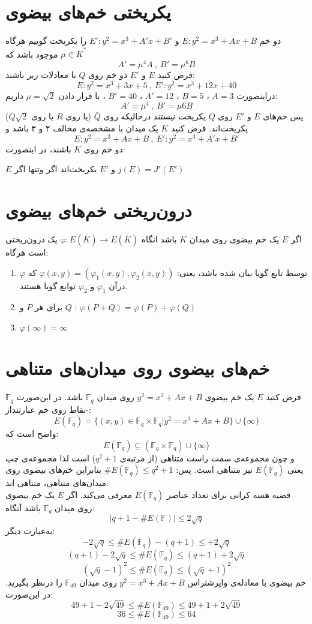 \section{یکریختی خم‌های بیضوی}
دو خم 
$E:y^2=x^3+Ax+B$
و
$E': y^2=x^3+A'x+B'$
را یکریخت گوییم هرگاه
$\mu \in {\bar{K}}^*$
موجود باشد که
$$ A'={\mu}^4A ~,~ B'={\mu}^6B $$
\example
فرض کنید
$E$
و
$E'$
دو خم روی 
$Q$
با معادلات زیر باشند:
$$ E:y^2=x^3+3x+5 ~,~  E':y^2=x^3+12x+40$$
دراینصورت
$A=3$
،
$B=5$
،
$A'=12$
،
$B'=40$
، با قرار دادن
$\mu = \sqrt{2}$
داریم:
$$ A'={\mu}^4 ~,~ B'={\mu}6B$$
پس خم‌های 
$E$
و
$E'$
روی
$Q$
 یکریخت نیستند درحالیکه روی
$\bar{Q}$
(یا روی 
$R$
یا روی
$Q\sqrt{2}$)
یکریخت‌اند.
\theorem
فرض کنید
$K$
یک میدان با مشخصه‌ی مخالف ۲ و ۳ باشد و 
$$ E:y^2=x^3+Ax+B ~,~ E': y^2=x^3+A'x+B' $$
دو خم روی
$K$
باشند، در اینصورت:
\begin{center}
$E$
و
$E'$
یکریخت‌اند اگر وتنها اگر 
$j(E)=J'(E')$
\end{center}

\section{درون‌ریختی خم‌های بیضوی}

اگر
$E$
یک خم بیضوی روی میدان
$K$
باشد انگاه
$\varphi : E(\bar{K}) \rightarrow E(\bar{K})$
یک درون‌ریختی است هرگاه:
\begin{enumerate}
\item{
$\varphi$
توسط تابع گویا بیان شده باشد، یعنی:
$\varphi(x,y) = (\varphi_1(x,y) , \varphi_2(x,y) )$
که درآن
$\varphi_1$
و
$\varphi_2$
توابع گویا هستند.
}
\item{
برای هر
$P$
و
$Q$
:
$\varphi(P+Q) = \varphi(P)+\varphi(Q)$
}
\item{
$\varphi(\infty) = \infty$
}
\end{enumerate}

\section{خم‌های بیضوی روی میدان‌های متناهی}

فرض کنید
$E$
یک خم بیضوی
$y^2=x^3+Ax+B$
روی میدان
$\mathbb{F}_q$
باشد. در این‌صورت 
$\mathbb{F}_q$-نقاط
روی خم عبارتنداز:
$$
 E(\mathbb{F}_q) = \{ (x,y) \in \mathbb{F}_q \times \mathbb{F}_q | y^2=x^3+Ax+B \} 
\cup \{ \infty \}
$$
واضح است که:
$$ E(\mathbb{F}_q) \subseteq (\mathbb{F}_q \times \mathbb{F}_q) \cup \{ \infty \} $$
و چون مجموعه‌ی سمت راست متناهی (از مرتبه‌ی
$q^2+1$)
است لذا مجموعه‌ی چپ یعنی
$E(\mathbb{F}_q)$
نیز متناهی است. پس:
$\# E(\mathbb{F}_q) \leq q^2+1$
بنابراین خم‌های بیضوی روی میدان‌های متناهی، متناهی اند.
\\
قضیه هسه کرانی برای تعداد عناصر 
$E(\mathbb{F}_q)$
معرفی می‌کند.
\theorem
اگر
$E$
یک خم بیضوی روی میدان
$\mathbb{F}_q$
باشد آنگاه:
$$ | q+1- \#E(\mathbb{F}) | \leq 2\sqrt{q} $$
به‌عبارت دیگر:
$$ -2\sqrt{q} \leq \# E(\mathbb{F}_q)  -(q+1) \leq +2\sqrt{q}$$
$$ (q+1)-2\sqrt{q} \leq \# E(\mathbb{F}_q) \leq (q+1)+2\sqrt{q}$$
$$ (\sqrt{q}-1)^2 \leq \# E(\mathbb{F}_q) \leq (\sqrt{q}+1)^2$$
\example
خم بیضوی با معادله‌ی وایرشتراس
$y^2=x^3+Ax+B$
روی میدان
$\mathbb{F}_{49}$
را درنظر بگیرید. در این‌صورت:
$$ 49+1-2\sqrt{49} \leq \# E(\mathbb{F}_{49}) \leq 49+1+2\sqrt{49}$$
$$ 36 \leq \# E(\mathbb{F}_{49}) \leq 64$$

